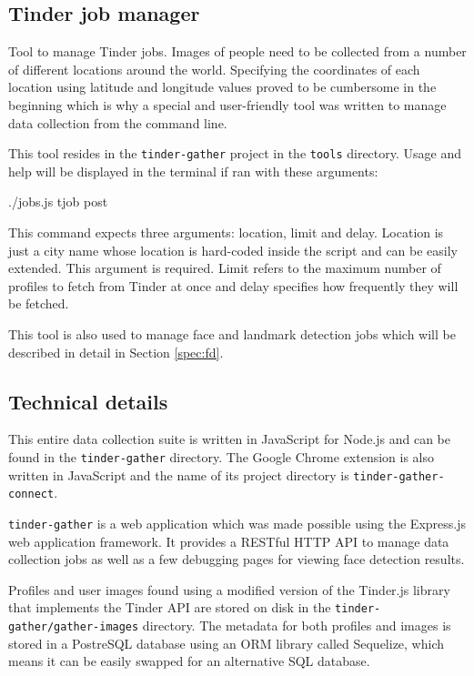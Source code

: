 \subsection{Tinder job manager}
\label{spec:data:jobs}
Tool to manage Tinder jobs.
Images of people need to be collected from a number of different locations 
around the world. Specifying the coordinates of each location using latitude 
and longitude values proved to be cumbersome in the beginning which is why a 
special and user-friendly tool was written to manage data collection from the 
command line.

This tool resides in the \texttt{tinder-gather} project in the \texttt{tools} 
directory. Usage and help will be displayed in the terminal if ran with these 
arguments:
\begin{logs}
./jobs.js tjob post
\end{logs}

This command expects three arguments: location, limit and delay. Location is 
just a city name whose location is hard-coded inside the script and can be 
easily extended. This argument is required. Limit refers to the maximum number 
of profiles to fetch from Tinder at once and delay specifies how frequently 
they will be fetched.

This tool is also used to manage face and landmark detection jobs which will 
be described in detail in Section \ref{spec:fd}. 


\subsection{Technical details}
This entire data collection suite is written in JavaScript for Node.js and can 
be found in the \texttt{tinder-gather} directory. The Google Chrome extension 
is also written in JavaScript and the name of its project directory is 
\texttt{tinder-gather-connect}.

\texttt{tinder-gather} is a web application which was made possible using the 
Express.js web application framework. It provides a RESTful HTTP API to manage 
data collection jobs as well as a few debugging pages for viewing face 
detection results.

Profiles and user images found using a modified version of the Tinder.js 
library that implements the Tinder API are stored on disk in the 
\texttt{tinder-gather/gather-images} directory. The metadata for both profiles 
and images is stored in a PostreSQL database using an ORM library called 
Sequelize, which means it can be easily swapped for an alternative SQL 
database.

